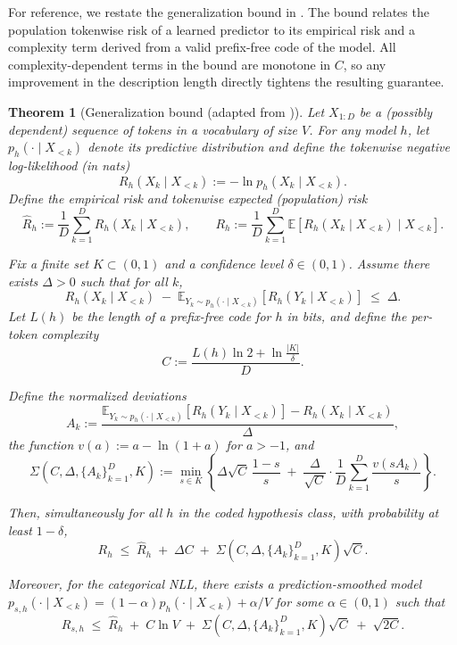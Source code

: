 \documentclass{article}
\theoremstyle{plain}
\newtheorem{theorem}{Theorem}[section]
\theoremstyle{definition}
\theoremstyle{remark}
\begin{document}
For reference, we restate the generalization bound in \citet{finzi2025compute}. The bound relates the population tokenwise risk of a learned predictor to its empirical risk and a complexity term derived from a valid prefix-free code of the model. All complexity-dependent terms in the bound are monotone in $C$, so any improvement in the description length directly tightens the resulting guarantee.




\begin{theorem}[Generalization bound (adapted from \citet{finzi2025compute})]
\label{thm:finzi_bound_rewritten}
Let $X_{1:D}$ be a (possibly dependent) sequence of tokens in a vocabulary of size $V$.
For any model $h$, let $p_h(\cdot \mid X_{<k})$ denote its predictive distribution and define the tokenwise negative log-likelihood (in nats)
\[
R_h(X_k \mid X_{<k}) := - \ln p_h(X_k \mid X_{<k}).
\]
Define the empirical risk and tokenwise expected (population) risk
\[
\widehat R_h := \frac{1}{D}\sum_{k=1}^D R_h(X_k \mid X_{<k}),
\qquad
R_h := \frac{1}{D}\sum_{k=1}^D \mathbb{E}\!\left[R_h(X_k \mid X_{<k}) \mid X_{<k}\right].
\]

Fix a finite set $K \subset (0,1)$ and a confidence level $\delta \in (0,1)$.
Assume there exists $\Delta > 0$ such that for all $k$,
\begin{equation}
\label{eq:finzi_delta_assump}
R_h(X_k \mid X_{<k}) \;-\; \mathbb{E}_{Y_k \sim p_h(\cdot \mid X_{<k})}\!\left[ R_h(Y_k \mid X_{<k}) \right] \;\le\; \Delta.
\end{equation}
Let $L(h)$ be the length of a prefix-free code for $h$ in bits, and define the per-token complexity
\[
C := \frac{L(h)\ln 2 + \ln\frac{|K|}{\delta}}{D}.
\]

Define the normalized deviations
\[
A_k := \frac{\mathbb{E}_{Y_k \sim p_h(\cdot \mid X_{<k})}[ R_h(Y_k \mid X_{<k})] - R_h(X_k \mid X_{<k})}{\Delta},
\]
the function $v(a) := a - \ln(1+a)$ for $a > -1$, and
\[
\Sigma(C,\Delta,\{A_k\}_{k=1}^D,K)
:=
\min_{s \in K}
\left\{
\Delta \sqrt{C}\,\frac{1-s}{s}
\;+\;
\frac{\Delta}{\sqrt{C}}\cdot \frac{1}{D}\sum_{k=1}^D \frac{v(sA_k)}{s}
\right\}.
\]

Then, simultaneously for all $h$ in the coded hypothesis class, with probability at least $1-\delta$,
\begin{equation}
\label{eq:finzi_core_bound_rewritten}
R_h \;\le\; \widehat R_h \;+\; \Delta C \;+\; \Sigma(C,\Delta,\{A_k\}_{k=1}^D,K)\sqrt{C}.
\end{equation}

Moreover, for the categorical NLL, there exists a prediction-smoothed model
$p_{s,h}(\cdot \mid X_{<k}) = (1-\alpha)p_h(\cdot \mid X_{<k}) + \alpha/V$
for some $\alpha \in (0,1)$ such that
\begin{equation}
\label{eq:finzi_smoothing_step_rewritten}
R_{s,h} \;\le\; \widehat R_h \;+\; C\ln V
\;+\; \Sigma(C,\Delta,\{A_k\}_{k=1}^D,K)\sqrt{C}
\;+\; \sqrt{2C}.
\end{equation}
\end{theorem}


%
%
%
%
%
%
%
%
%
%
%
%
%
%
%
%
%
%
%
%
%
%
%
%
%
%
%
%
%
%
%
%
%
%
%
%
%
%
%
%
%
%
%
%
%
%
%
%
%
%
%
%
%
%
%
%
%
%
%
%
%
%
%
%
%
%
%
%
%
%
%
%
%
%
%
%
%
%
%
%
%
%
%
%
%
%
%
%
%
%
%
%
%
%
%
%
%
%
%
%
%
%
%
%
%
%
%
%
%
%
%
%
%
%
%
%
%
%
%
%

%
\end{document}

